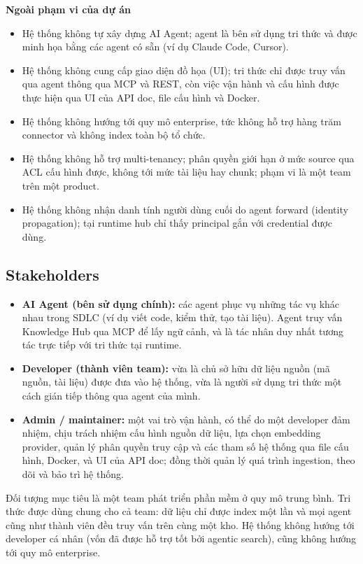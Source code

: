 \textbf{Ngoài phạm vi của dự án}

\begin{itemize}
  \item Hệ thống không tự xây dựng AI Agent; agent là bên sử dụng tri thức và được minh họa bằng các agent có sẵn (ví dụ Claude Code, Cursor).
  \item Hệ thống không cung cấp giao diện đồ họa (UI); tri thức chỉ được truy vấn qua agent thông qua MCP và REST, còn việc vận hành và cấu hình được thực hiện qua UI của API doc, file cấu hình và Docker.
  \item Hệ thống không hướng tới quy mô enterprise, tức không hỗ trợ hàng trăm connector và không index toàn bộ tổ chức.
  \item Hệ thống không hỗ trợ multi-tenancy; phân quyền giới hạn ở mức source qua ACL cấu hình được, không tới mức tài liệu hay chunk; phạm vi là một team trên một product.
  \item Hệ thống không nhận danh tính người dùng cuối do agent forward (identity propagation); tại runtime hub chỉ thấy principal gắn với credential được dùng.
\end{itemize}

\subsection{Stakeholders}

\begin{itemize}
  \item \textbf{AI Agent (bên sử dụng chính):} các agent phục vụ những tác vụ khác nhau trong SDLC (ví dụ viết code, kiểm thử, tạo tài liệu). Agent truy vấn Knowledge Hub qua MCP để lấy ngữ cảnh, và là tác nhân duy nhất tương tác trực tiếp với tri thức tại runtime.
  \item \textbf{Developer (thành viên team):} vừa là chủ sở hữu dữ liệu nguồn (mã nguồn, tài liệu) được đưa vào hệ thống, vừa là người sử dụng tri thức một cách gián tiếp thông qua agent của mình.
  \item \textbf{Admin / maintainer:} một vai trò vận hành, có thể do một developer đảm nhiệm, chịu trách nhiệm cấu hình nguồn dữ liệu, lựa chọn embedding provider, quản lý phân quyền truy cập và các tham số hệ thống qua file cấu hình, Docker, và UI của API doc; đồng thời quản lý quá trình ingestion, theo dõi và bảo trì hệ thống.
\end{itemize}

Đối tượng mục tiêu là một team phát triển phần mềm ở quy mô trung bình. Tri thức được dùng chung cho cả team: dữ liệu chỉ được index một lần và mọi agent cũng như thành viên đều truy vấn trên cùng một kho. Hệ thống không hướng tới developer cá nhân (vốn đã được hỗ trợ tốt bởi agentic search), cũng không hướng tới quy mô enterprise.

